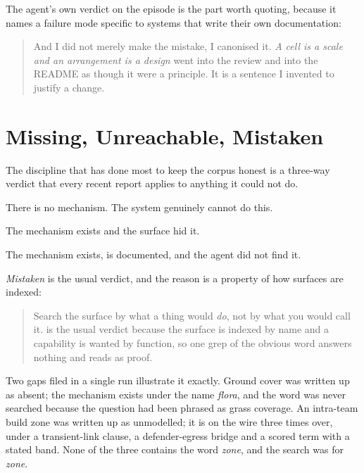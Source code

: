 The agent's own verdict on the episode is the part worth quoting, because it names
a failure mode specific to systems that write their own documentation:

\begin{quote}
And I did not merely make the mistake, I canonised it. \emph{A cell is a scale and
an arrangement is a design} went into the review and into the README as though it
were a principle. It is a sentence I invented to justify a change.
\end{quote}

\section{Missing, Unreachable, Mistaken}

The discipline that has done most to keep the corpus honest is a three-way verdict
that every recent report applies to anything it could not do.

\begin{description}[leftmargin=1.6em,style=nextline,itemsep=4pt]
  \item[Missing] There is no mechanism. The system genuinely cannot do this.
  \item[Unreachable] The mechanism exists and the surface hid it.
  \item[Mistaken] The mechanism exists, is documented, and the agent did not find it.
\end{description}

\emph{Mistaken} is the usual verdict, and the reason is a property of how surfaces
are indexed:

\begin{quote}
Search the surface by what a thing would \emph{do}, not by what you would call it.
 is the usual verdict because the surface is indexed by name and a
capability is wanted by function, so one grep of the obvious word answers nothing
and reads as proof.
\end{quote}

Two gaps filed in a single run illustrate it exactly. Ground cover was written up
as absent; the mechanism exists under the name \emph{flora}, and the word was never
searched because the question had been phrased as grass coverage. An intra-team
build zone was written up as unmodelled; it is on the wire three times over, under
a transient-link clause, a defender-egress bridge and a scored term with a stated
band. None of the three contains the word \emph{zone}, and the search was for
\emph{zone}.

